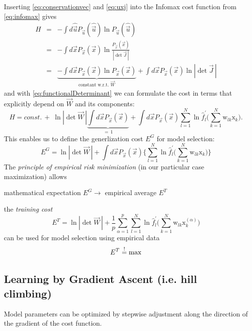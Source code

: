 \newpage

Inserting \eqref{eq:conservationvec} and \eqref{eq:uxj} into the Infomax cost function from \eqref{eq:infomax} gives 
\begin{eqnarray}
H & = & -\int d \widehat{\vec{u}} P_{\vec{u}} (\widehat{\vec{u}})
  \ln P_{\vec{u}} (\widehat{\vec{u}}) \\
& = &  
-\int d \vec{x} P_{\vec{x}} (\vec{x}) \ln \frac{P_{\vec{x}}(\vec{x})}{|\det \vec{J}\,|} \\
& = & 
\underbrace{
    -\int d \vec{x} P_{\vec{x}} (\vec{x}) \ln P_{\vec{x}}(\vec{x})
}_{ \text{constant w.r.t. } \vec W } 
    + \int d \vec{x} P_{\vec{x}} (\vec{x}) \ln |\det \vec{J}\,|
\end{eqnarray}
and with \eqref{eq:functionalDeterminant} we can formulate the cost 
in terms that explicitly depend on $\vec W$ and its components:
\begin{equation}
	H = const. \, + \; \ln |\det \vec{W}\,| \underbrace{\int d \vec{x} P_{\vec{x}} (\vec{x})}_{=\,1}
		+ \int d \vec{x} P_{\vec{x}} (\vec{x}) \sum\limits_{l = 1}^N
			\ln \widehat{f}_l^{'} \Bigg( \sum\limits_{k = 1}^N 
			\mathrm{w}_{lk} \mathrm{x}_k \Bigg).
\end{equation}
This enables us to define the generlization cost $E^G$ for model selection:
\begin{equation} \tag{generalization cost}
	E^G = \ln |\det \vec W\,| + \int d \vec{x} P_{\vec{x}} (\vec{x})
		\Bigg\{ \sum\limits_{l = 1}^N \ln
			\widehat{f}_l^{'} \Bigg( \sum\limits_{k = 1}^N 
			\mathrm{w}_{lk} \mathrm{x}_k \Bigg)
		\Bigg\}
\end{equation}
The \emph{principle of empirical risk minimization} (in our particular case maximization) allows
\begin{center}
mathematical expectation $E^G \longrightarrow$ empirical average $E^T$
\end{center}
the \emph{training cost}
\begin{equation} \label{eq:trainingCost}
	E^T = \ln |\det \vec{W}\,| + \frac{1}{p} \sum\limits_{\alpha = 1}^p
		\sum\limits_{l = 1}^N \ln \widehat{f}_l^{'} \Bigg( 
		\sum\limits_{k = 1}^N \mathrm{w}_{lk} 
		\mathrm{x}_k^{(\alpha)} \Bigg)
\end{equation}
can be used for model selection using empirical data 
\begin{equation}
E^T \stackrel{\mathrm{!}}{=} \max
\end{equation}

\newpage

\subsection{Learning by Gradient Ascent (i.e. hill climbing)}
Model parameters can be optimized by stepwise adjustment along the direction of the gradient of the cost function. 

